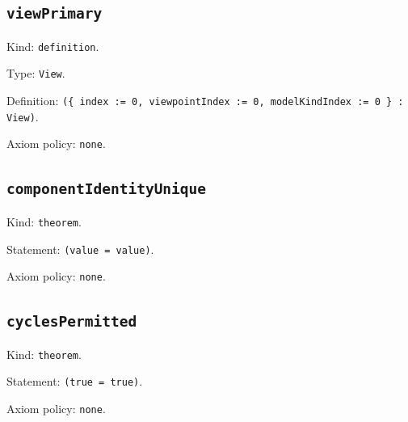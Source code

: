 \documentclass[11pt]{article}
\begin{document}
\subsection*{\texttt{viewPrimary}}
\noindent Kind: \texttt{definition}.\par
\noindent Type: \texttt{View}.\par
\noindent Definition: \texttt{(\{ index := 0, viewpointIndex := 0, modelKindIndex := 0 \} : View)}.\par
\noindent Axiom policy: \texttt{none}.\par
\subsection*{\texttt{componentIdentityUnique}}
\noindent Kind: \texttt{theorem}.\par
\noindent Statement: \texttt{(value = value)}.\par
\noindent Axiom policy: \texttt{none}.\par
\subsection*{\texttt{cyclesPermitted}}
\noindent Kind: \texttt{theorem}.\par
\noindent Statement: \texttt{(true = true)}.\par
\noindent Axiom policy: \texttt{none}.\par
\end{document}
